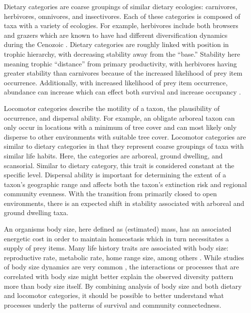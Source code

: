 \documentclass[12pt,letterpaper]{article}
\begin{document}
Dietary categories are coarse groupings of similar dietary ecologies: carnivores, herbivores, omnivores, and insectivores. Each of these categories is composed of taxa with a variety of ecologies. For example, herbivores include both browsers and grazers which are known to have had different diversification dynamics during the Cenozoic \citep{Janis2000}. Dietary categories are roughly linked with position in trophic hierarchy, with decreasing stability away from the ``base.'' Stability here meaning trophic ``distance'' from primary productivity, with herbivores having greater stability than carnivores because of the increased likelihood of prey item occurrence. Additionally, with increased likelihood of prey item occurrence, abundance can increase \citep{VanValen1989,Brown1987,Damuth1979,Silva1997,Janis2000} which can effect both survival and increase occupancy \citep{Jernvall2004,Brown1984,Jernvall2002,Fortelius2002}.

Locomotor categories describe the motility of a taxon, the plausibility of occurrence, and dispersal ability. For example, an obligate arboreal taxon can only occur in locations with a minimum of tree cover and can most likely only disperse to other environments with suitable tree cover. Locomotor categories are similar to dietary categories in that they represent coarse groupings of taxa with similar life habits. Here, the categories are arboreal, ground dwelling, and scansorial. Similar to dietary category, this trait is considered constant at the specific level. Dispersal ability is important for determining the extent of a taxon's geographic range \citep{Birand2012,Jablonski2006a,Gaston2009} and affects both the taxon's extinction risk and regional community evenness. With the transition from primarily closed to open environments, there is an expected shift in stability associated with arboreal and ground dwelling taxa.

An organisms body size, here defined as (estimated) mass, has an associated energetic cost in order to maintain homeostasis which in turn necessitates a supply of prey items. Many life history traits are associated with body size: reproductive rate, metabolic rate, home range size, among others \cite{Peters1983a,Damuth1979,Brown1987,Smith2004}. While studies of body size dynamics are very common \citep{Clauset2008a,Damuth1981a,Johnson2002b,Liow2008,Alroy2000g}, the interactions or processes that are correlated with body size might better explain the observed diversity pattern more than body size itself. By combining analysis of body size and both dietary and locomotor categories, it should be possible to better understand what processes underly the patterns of survival and community connectedness.
\end{document}
